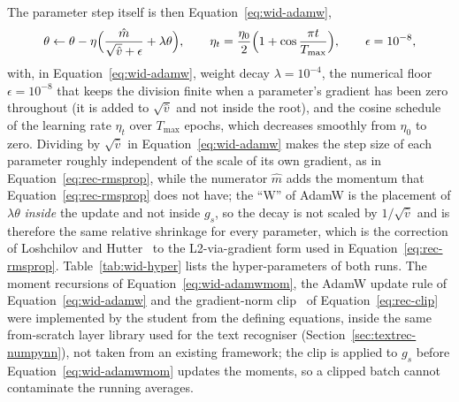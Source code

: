The parameter step itself is then Equation~\ref{eq:wid-adamw},
\begin{equation}
\theta\leftarrow\theta-\eta\Bigl(\frac{\hat m}{\sqrt{\hat v}+\epsilon}+\lambda\theta\Bigr),\qquad\eta_t=\frac{\eta_0}{2}\Bigl(1+\cos\frac{\pi t}{T_{\max}}\Bigr),\qquad\epsilon=10^{-8},
\label{eq:wid-adamw}
\end{equation}
with, in Equation~\ref{eq:wid-adamw}, weight decay $\lambda=10^{-4}$, the numerical floor $\epsilon=10^{-8}$ that keeps the division finite when a parameter's gradient has been zero throughout (it is added to $\sqrt{\hat v}$ and not inside the root), and the cosine schedule of the learning rate $\eta_t$ over $T_{\max}$ epochs, which decreases smoothly from $\eta_0$ to zero.
Dividing by $\sqrt{\hat v}$ in Equation~\ref{eq:wid-adamw} makes the step size of each parameter roughly independent of the scale of its own gradient, as in Equation~\ref{eq:rec-rmsprop}, while the numerator $\hat m$ adds the momentum that Equation~\ref{eq:rec-rmsprop} does not have; the ``W'' of AdamW is the placement of $\lambda\theta$ \emph{inside} the update and not inside $g_s$, so the decay is not scaled by $1/\sqrt{\hat v}$ and is therefore the same relative shrinkage for every parameter, which is the correction of Loshchilov and Hutter~\cite{loshchilov2019} to the L2-via-gradient form used in Equation~\ref{eq:rec-rmsprop}.
Table~\ref{tab:wid-hyper} lists the hyper-parameters of both runs.
The moment recursions of Equation~\ref{eq:wid-adamwmom}, the AdamW update rule of Equation~\ref{eq:wid-adamw} and the gradient-norm clip~\cite{pascanu2013} of Equation~\ref{eq:rec-clip} were implemented by the student from the defining equations, inside the same from-scratch layer library used for the text recogniser (Section~\ref{sec:textrec-numpynn}), not taken from an existing framework; the clip is applied to $g_s$ before Equation~\ref{eq:wid-adamwmom} updates the moments, so a clipped batch cannot contaminate the running averages.

